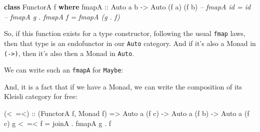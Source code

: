 \documentclass[]{article}
\newenvironment{Shaded}{}{}
\newcommand{\KeywordTok}[1]{\textcolor[rgb]{0.00,0.44,0.13}{\textbf{{#1}}}}
\newcommand{\DataTypeTok}[1]{\textcolor[rgb]{0.56,0.13,0.00}{{#1}}}
\newcommand{\CommentTok}[1]{\textcolor[rgb]{0.38,0.63,0.69}{\textit{{#1}}}}
\newcommand{\OtherTok}[1]{\textcolor[rgb]{0.00,0.44,0.13}{{#1}}}
\newcommand{\FunctionTok}[1]{\textcolor[rgb]{0.02,0.16,0.49}{{#1}}}
\newcommand{\NormalTok}[1]{{#1}}
\begin{document}
\begin{Shaded}
\begin{Highlighting}[]
\KeywordTok{class} \DataTypeTok{FunctorA} \NormalTok{f }\KeywordTok{where}
\OtherTok{    fmapA ::} \DataTypeTok{Auto} \NormalTok{a b }\OtherTok{->} \DataTypeTok{Auto} \NormalTok{(f a) (f b)}
    \CommentTok{-- fmapA id = id}
    \CommentTok{-- fmapA g . fmapA f = fmapA (g . f)}
\end{Highlighting}
\end{Shaded}

So, if this function exists for a type constructor, following the usual
\texttt{fmap} laws, then that type is an endofunctor in our
\texttt{Auto} category. And if it's also a Monad in
\texttt{(-\textgreater{})}, then it's also then a Monad in
\texttt{Auto}.

We can write such an \texttt{fmapA} for \texttt{Maybe}:

\begin{Shaded}
\end{Shaded}

And, it is a fact that if we have a Monad, we can write the composition
of its Kleisli category for free:

\begin{Shaded}
\begin{Highlighting}[]
\OtherTok{(<~=<) ::} \NormalTok{(}\DataTypeTok{FunctorA} \NormalTok{f, }\DataTypeTok{Monad} \NormalTok{f) }\OtherTok{=>} \DataTypeTok{Auto} \NormalTok{a (f c) }\OtherTok{->} \DataTypeTok{Auto} \NormalTok{a (f b) }\OtherTok{->} \DataTypeTok{Auto} \NormalTok{a (f c)}
\NormalTok{g }\FunctionTok{<~=<} \NormalTok{f }\FunctionTok{=} \NormalTok{joinA }\FunctionTok{.} \NormalTok{fmapA g }\FunctionTok{.} \NormalTok{f}
\end{Highlighting}
\end{Shaded}
\end{document}
